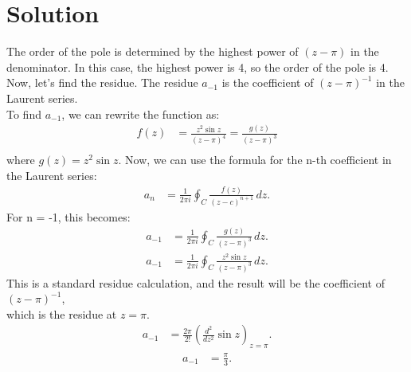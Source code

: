 \documentclass[journal,12pt,twocolumn]{IEEEtran}
\theoremstyle{remark}
\begin{document}
\section{Solution}
The order of the pole is determined by the highest power of $(z-\pi)$ in the denominator.
In this case, the highest power is 4, so the order of the pole is 4.
\newline
\newline
Now, let's find the residue. The residue $a_{-1}$ is the coefficient of $(z-\pi)^{-1}$ in the Laurent series.\\
To find $a_{-1}$, we can rewrite the function as:
\begin{align}
f(z) &= \frac{z^2 \sin z}{(z-\pi)^4} = \frac{g(z)}{(z-\pi)^3} \\
\end{align}
where $g(z) = z^2 \sin z$.
\newline
\newline
Now, we can use the formula for the n-th coefficient in the Laurent series:
\begin{align}
a_n &= \frac{1}{2\pi i} \oint_C \frac{f(z)}{(z-c)^{n+1}} \,dz.
\end{align}
For n = -1, this becomes:
\begin{align}
a_{-1} &= \frac{1}{2\pi i} \oint_C \frac{g(z)}{(z-\pi)^3} \,dz.
\end{align}
\begin{align}
a_{-1} &= \frac{1}{2\pi i} \oint_C \frac{z^2 \sin z}{(z-\pi)^3} \,dz.
\end{align}
This is a standard residue calculation, and the result will be the coefficient of $(z-\pi)^{-1}$, \\
which is the residue at $z=\pi$.
\begin{align}
a_{-1} &= \frac{2\pi}{2!} \left(\frac{d^2}{dz^2} \sin z\right)_{z=\pi}.
\end{align}
\begin{align}
a_{-1} &= \frac{\pi}{3}.
\end{align}
\end{document}
